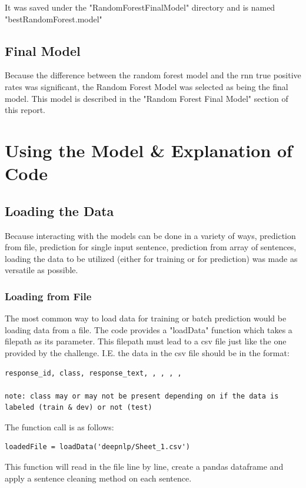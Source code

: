 \documentclass[twoside,twocolumn]{article}
\begin{document}
It was saved under the "RandomForestFinalModel" directory and is named "bestRandomForest.model"

\subsection{Final Model}

Because the difference between the random forest model and the rnn true positive rates was significant,
the Random Forest Model was selected as being the final model. This model is described in the "Random Forest Final Model"
section of this report.


\section{Using the Model & Explanation of Code}

\subsection{Loading the Data}

Because interacting with the models can be done in a variety of ways, prediction from file, prediction for single input sentence,
prediction from array of sentences, loading the data to be utilized (either for training or for prediction) was made as versatile as possible.

\subsubsection{Loading from File}

The most common way to load data for training or batch prediction would be loading data from a file. The code provides a "loadData" function
which takes a filepath as its parameter. This filepath must lead to a csv file just like the one provided by the challenge. I.E. the data in 
the csv file should be in the format:
\begin{lstlisting}
response_id, class, response_text, , , , , 

note: class may or may not be present depending on if the data is labeled (train & dev) or not (test)
\end{lstlisting}

The function call is as follows:
\begin{lstlisting}
loadedFile = loadData('deepnlp/Sheet_1.csv')
\end{lstlisting}

This function will read in the file line by line, create a pandas dataframe and apply a sentence cleaning method on each sentence.
\end{document}

